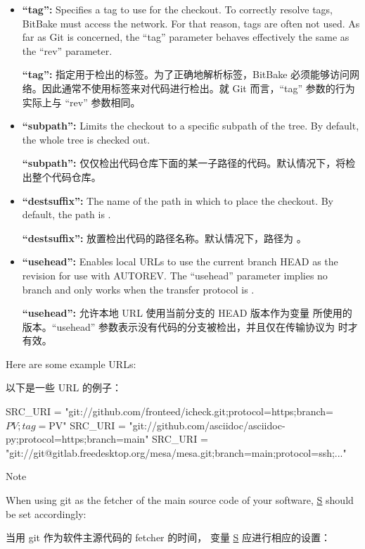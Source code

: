 \begin{itemize}
\item \textbf{``tag'':} Specifies a tag to use for the checkout. To correctly resolve tags, BitBake must access the network. For that reason, tags are often not used. As far as Git is concerned, the ``tag'' parameter behaves effectively the same as the ``rev'' parameter.

\medskip
\textbf{``tag'':} 指定用于检出的标签。为了正确地解析标签，BitBake 必须能够访问网络。因此通常不使用标签来对代码进行检出。就 Git 而言，``tag'' 参数的行为实际上与 ``rev'' 参数相同。


\item \textbf{``subpath'':} Limits the checkout to a specific subpath of the tree. By default, the whole tree is checked out.

\medskip
\textbf{``subpath'':} 仅仅检出代码仓库下面的某一子路径的代码。默认情况下，将检出整个代码仓库。

\item \textbf{``destsuffix'':} The name of the path in which to place the checkout. By default, the path is .

\medskip
\textbf{``destsuffix'':} 放置检出代码的路径名称。默认情况下，路径为 。

\item \textbf{``usehead'':} Enables local  URLs to use the current branch HEAD as the revision for use with AUTOREV. The ``usehead'' parameter implies no branch and only works when the transfer protocol is .

\medskip
\textbf{``usehead'':} 允许本地  URL 使用当前分支的 HEAD 版本作为变量  所使用的版本。“usehead” 参数表示没有代码的分支被检出，并且仅在传输协议为  时才有效。
\end{itemize}

Here are some example URLs:

以下是一些 URL 的例子：

\begin{pyglist}
SRC_URI = "git://github.com/fronteed/icheck.git;protocol=https;branch=${PV};tag=${PV}"
SRC_URI = "git://github.com/asciidoc/asciidoc-py;protocol=https;branch=main"
SRC_URI = "git://git@gitlab.freedesktop.org/mesa/mesa.git;branch=main;protocol=ssh;..."
\end{pyglist}

\begin{noteblock}{Note}%

When using git as the fetcher of the main source code of your software, \href{https://docs.yoctoproject.org/ref-manual/variables.html#term-S}{S} should be set accordingly:

\medskip
当用 git 作为软件主源代码的 fetcher 的时间， 变量 \href{https://docs.yoctoproject.org/ref-manual/variables.html#term-S}{S} 应进行相应的设置：


\end{noteblock}

